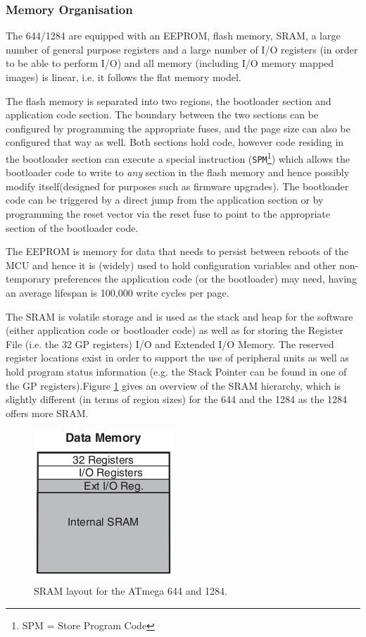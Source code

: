 \documentclass[12pt,a4paper,twocolumn]{article}
\begin{document}
	\subsubsection{Memory Organisation}
	The 644/1284 are equipped with an EEPROM, flash memory, SRAM, a large number of general purpose registers and a large number of I/O registers (in order to be able to perform I/O) and all memory (including I/O memory mapped images) is linear, i.e. it follows the flat memory model.
	
	The flash memory is separated into two regions, the bootloader section and application code section. The boundary between the two sections can be configured by programming the appropriate fuses, and the page size can also be configured that way as well. Both sections hold code, however code residing in the bootloader section can execute a special instruction (\texttt{SPM}\footnote{SPM = Store Program Code}) which allows the bootloader code to write to \textit{any} section in the flash memory and hence possibly modify itself(designed for purposes such as firmware upgrades). The bootloader code can be triggered by a direct jump from the application section or by programming the reset vector via the reset fuse to point to the appropriate section of the bootloader code. 
	
	The EEPROM is memory for data that needs to persist between reboots of the MCU and hence it is (widely) used to hold configuration variables and other non-temporary preferences the application code (or the bootloader) may need, having an average lifespan is 100,000 write cycles per page. 
	
	The SRAM is volatile storage and is used as the stack and heap for the software (either application code or bootloader code) as well as for storing the Register File (i.e. the 32 GP registers) I/O and Extended I/O Memory. The reserved register locations exist in order to support the use of peripheral units as well as hold program status information (e.g. the Stack Pointer can be found in one of the GP registers).Figure \ref{fig:stack} gives an overview of the SRAM hierarchy, which is slightly different (in terms of region sizes) for the 644 and the 1284 as the 1284 offers more SRAM.
	
	\begin{figure}
		\includegraphics[scale=1]{img/stack.png}
		\caption{SRAM layout for the ATmega 644 and 1284.}
		\label{fig:stack}		
	\end{figure}
	
\end{document}
